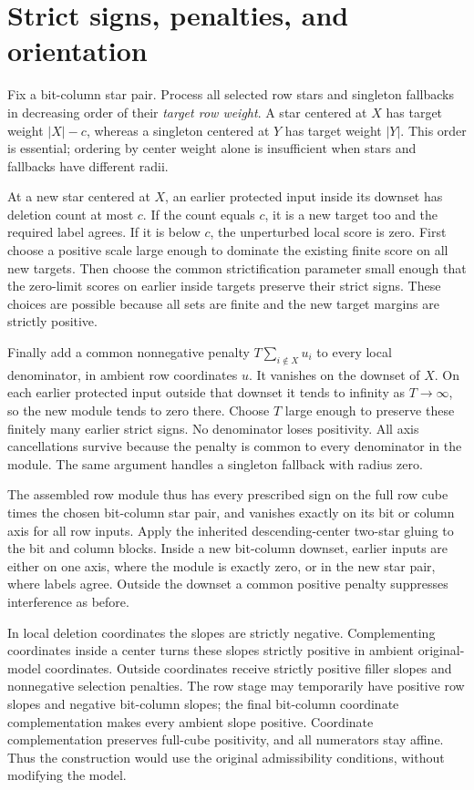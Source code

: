 \documentclass[11pt]{article}
\begin{document}
\section{Strict signs, penalties, and orientation}

Fix a bit-column star pair. Process all selected row stars and
singleton fallbacks in decreasing order of their \emph{target row
weight}. A star centered at $X$ has target weight $|X|-c$, whereas a
singleton centered at $Y$ has target weight $|Y|$. This order is
essential; ordering by center weight alone is insufficient when
stars and fallbacks have different radii.

At a new star centered at $X$, an earlier protected input inside its
downset has deletion count at most $c$. If the count equals $c$, it
is a new target too and the required label agrees. If it is below
$c$, the unperturbed local score is zero. First choose a positive
scale large enough to dominate the existing finite score on all new
targets. Then choose the common strictification parameter small
enough that the zero-limit scores on earlier inside targets preserve
their strict signs. These choices are possible because all sets are
finite and the new target margins are strictly positive.

Finally add a common nonnegative penalty
$T\sum_{i\notin X}u_i$ to every local denominator, in ambient row
coordinates $u$. It vanishes on the downset of $X$. On each earlier
protected input outside that downset it tends to infinity as
$T\to\infty$, so the new module tends to zero there. Choose $T$
large enough to preserve these finitely many earlier strict signs.
No denominator loses positivity. All axis cancellations survive
because the penalty is common to every denominator in the module.
The same argument handles a singleton fallback with radius zero.

The assembled row module thus has every prescribed sign on the full
row cube times the chosen bit-column star pair, and vanishes exactly
on its bit or column axis for all row inputs. Apply the inherited
descending-center two-star gluing to the bit and column blocks.
Inside a new bit-column downset, earlier inputs are either on one
axis, where the module is exactly zero, or in the new star pair,
where labels agree. Outside the downset a common positive penalty
suppresses interference as before.

In local deletion coordinates the slopes are strictly negative.
Complementing coordinates inside a center turns these slopes
strictly positive in ambient original-model coordinates. Outside
coordinates receive strictly positive filler slopes and
nonnegative selection penalties. The row stage may temporarily have
positive row slopes and negative bit-column slopes; the final
bit-column coordinate complementation makes every ambient slope
positive. Coordinate complementation preserves full-cube positivity,
and all numerators stay affine. Thus the construction would use the
original admissibility conditions, without modifying the model.
\end{document}
